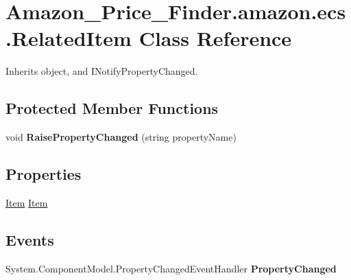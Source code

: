 \hypertarget{class_amazon___price___finder_1_1amazon_1_1ecs_1_1_related_item}{\section{Amazon\-\_\-\-Price\-\_\-\-Finder.\-amazon.\-ecs.\-Related\-Item Class Reference}
\label{class_amazon___price___finder_1_1amazon_1_1ecs_1_1_related_item}
}


 




Inherits object, and I\-Notify\-Property\-Changed.

\subsection*{Protected Member Functions}
\begin{DoxyCompactItemize}
\item 
\hypertarget{class_amazon___price___finder_1_1amazon_1_1ecs_1_1_related_item_a14c603d1e0aadf36d7b0571c91ffb273}{void {\bfseries Raise\-Property\-Changed} (string property\-Name)}\label{class_amazon___price___finder_1_1amazon_1_1ecs_1_1_related_item_a14c603d1e0aadf36d7b0571c91ffb273}

\end{DoxyCompactItemize}
\subsection*{Properties}
\begin{DoxyCompactItemize}
\item 
\hypertarget{class_amazon___price___finder_1_1amazon_1_1ecs_1_1_related_item_ae688a499d83b09e46c5cd320f90a5762}{\hyperlink{class_amazon___price___finder_1_1amazon_1_1ecs_1_1_item}{Item} \hyperlink{class_amazon___price___finder_1_1amazon_1_1ecs_1_1_related_item_ae688a499d83b09e46c5cd320f90a5762}{Item}}\label{class_amazon___price___finder_1_1amazon_1_1ecs_1_1_related_item_ae688a499d83b09e46c5cd320f90a5762}

\begin{DoxyCompactList}\small\item\em \end{DoxyCompactList}\end{DoxyCompactItemize}
\subsection*{Events}
\begin{DoxyCompactItemize}
\item 
\hypertarget{class_amazon___price___finder_1_1amazon_1_1ecs_1_1_related_item_ae1b3ffdb14967ef769f661243c438eca}{System.\-Component\-Model.\-Property\-Changed\-Event\-Handler {\bfseries Property\-Changed}}\label{class_amazon___price___finder_1_1amazon_1_1ecs_1_1_related_item_ae1b3ffdb14967ef769f661243c438eca}

\end{DoxyCompactItemize}


